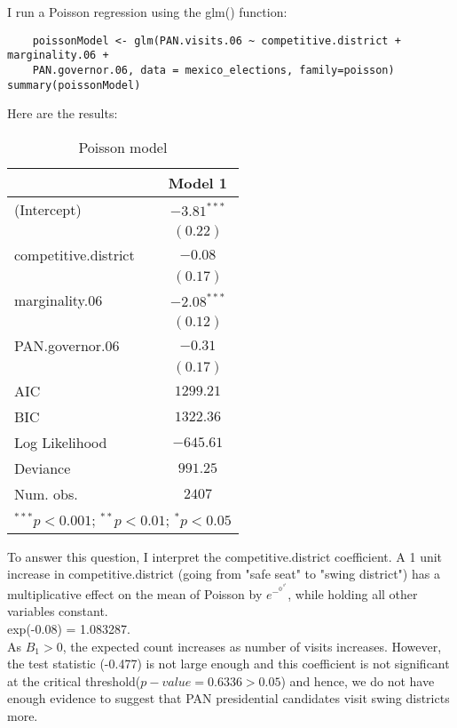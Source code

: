 \documentclass{article}
\begin{document}
I run a Poisson regression using the glm() function:
\begin{verbatim}
    poissonModel <- glm(PAN.visits.06 ~ competitive.district + marginality.06 + 
    PAN.governor.06, data = mexico_elections, family=poisson)
summary(poissonModel)

\end{verbatim}

Here are the results:
\begin{table} [H]
\begin{center}
\begin{tabular}{l c}
\hline
 & Model 1 \\
\hline
(Intercept)          & $-3.81^{***}$ \\
                     & $(0.22)$      \\
competitive.district & $-0.08$       \\
                     & $(0.17)$      \\
marginality.06       & $-2.08^{***}$ \\
                     & $(0.12)$      \\
PAN.governor.06      & $-0.31$       \\
                     & $(0.17)$      \\
\hline
AIC                  & $1299.21$     \\
BIC                  & $1322.36$     \\
Log Likelihood       & $-645.61$     \\
Deviance             & $991.25$      \\
Num. obs.            & $2407$        \\
\hline
\multicolumn{2}{l}{\scriptsize{$^{***}p<0.001$; $^{**}p<0.01$; $^{*}p<0.05$}}
\end{tabular}
\caption{Poisson model}
\label{table:coefficients}
\end{center}
\end{table}

To answer this question, I interpret the competitive.district coefficient.
A 1 unit increase in competitive.district (going from "safe seat" to "swing district") has a multiplicative effect on the mean of Poisson by 
$e^-^0^.^0^8$, while holding all other variables constant. 
\\
exp(-0.08) = 1.083287. 
\\
As $B_1 > 0$, the expected count increases as number of visits increases.
However, the test statistic (-0.477) is not large enough and this coefficient is not significant at the critical threshold($p-value = 0.6336 > 0.05$) and hence, we do not have enough evidence to suggest that PAN presidential candidates visit swing districts more.
\end{document}
